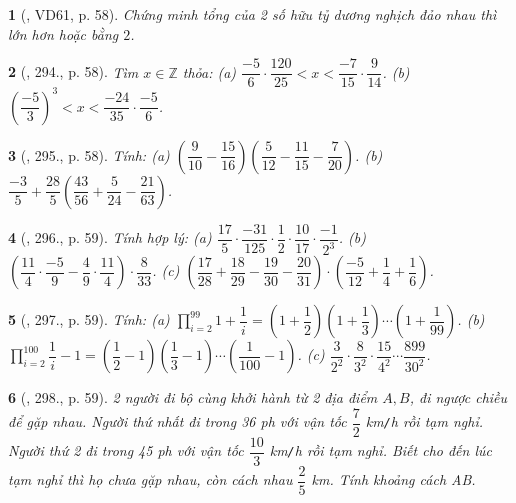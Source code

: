 \documentclass{article}
\newtheorem{baitoan}{}
\begin{document}
\begin{baitoan}[\cite{Tuyen_Toan_6}, VD61, p. 58]
	Chứng minh tổng của 2 số hữu tỷ dương nghịch đảo nhau thì lớn hơn hoặc bằng $2$.
\end{baitoan}

\begin{baitoan}[\cite{Tuyen_Toan_6}, 294., p. 58]
	Tìm $x\in\mathbb{Z}$ thỏa: (a) $\dfrac{-5}{6}\cdot\dfrac{120}{25} < x < \dfrac{-7}{15}\cdot\dfrac{9}{14}$. (b) $\left(\dfrac{-5}{3}\right)^3 < x < \dfrac{-24}{35}\cdot\dfrac{-5}{6}$.
\end{baitoan}

\begin{baitoan}[\cite{Tuyen_Toan_6}, 295., p. 58]
	Tính: (a) $\left(\dfrac{9}{10} - \dfrac{15}{16}\right)\left(\dfrac{5}{12} - \dfrac{11}{15} - \dfrac{7}{20}\right)$. (b) $\dfrac{-3}{5} + \dfrac{28}{5}\left(\dfrac{43}{56} + \dfrac{5}{24} - \dfrac{21}{63}\right)$.
\end{baitoan}

\begin{baitoan}[\cite{Tuyen_Toan_6}, 296., p. 59]
	Tính hợp lý: (a) $\dfrac{17}{5}\cdot\dfrac{-31}{125}\cdot\dfrac{1}{2}\cdot\dfrac{10}{17}\cdot\dfrac{-1}{2^3}$. (b) $\left(\dfrac{11}{4}\cdot\dfrac{-5}{9} - \dfrac{4}{9}\cdot\dfrac{11}{4}\right)\cdot\dfrac{8}{33}$. (c) $\left(\dfrac{17}{28} + \dfrac{18}{29} - \dfrac{19}{30} - \dfrac{20}{31}\right)\cdot\left(\dfrac{-5}{12} + \dfrac{1}{4} + \dfrac{1}{6}\right)$.
\end{baitoan}

\begin{baitoan}[\cite{Tuyen_Toan_6}, 297., p. 59]
	Tính: (a) $\prod_{i=2}^{99} 1 + \dfrac{1}{i} = \left(1 + \dfrac{1}{2}\right)\left(1 + \dfrac{1}{3}\right)\cdots\left(1 + \dfrac{1}{99}\right)$. (b) $\prod_{i=2}^{100} \dfrac{1}{i} - 1 = \left(\dfrac{1}{2} - 1\right)\left(\dfrac{1}{3} - 1\right)\cdots\left(\dfrac{1}{100} - 1\right)$. (c) $\dfrac{3}{2^2}\cdot\dfrac{8}{3^2}\cdot\dfrac{15}{4^2}\cdots\dfrac{899}{30^2}$.
\end{baitoan}

\begin{baitoan}[\cite{Tuyen_Toan_6}, 298., p. 59]
	2 người đi bộ cùng khởi hành từ 2 địa điểm $A,B$, đi ngược chiều để gặp nhau. Người thứ nhất đi trong {\rm36 ph} với vận tốc $\dfrac{7}{2}$ {\rm km{\tt/}h} rồi tạm nghỉ. Người thứ 2 đi trong {\rm45 ph} với vận tốc $\dfrac{10}{3}$ {\rm km{\tt/}h} rồi tạm nghỉ. Biết cho đến lúc tạm nghỉ thì họ chưa gặp nhau, còn cách nhau $\dfrac{2}{5}$ {\rm km}. Tính khoảng cách AB.
\end{baitoan}
\end{document}
